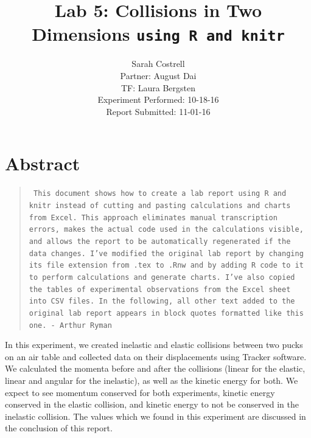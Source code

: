 \documentclass[11pt]{article}
\begin{document}

%
\author{Sarah Costrell\\Partner: August Dai\\TF: Laura Bergsten\\Experiment Performed: 10-18-16\\Report Submitted: 11-01-16}
\title{Lab 5: Collisions in Two Dimensions {\tt using R and knitr}}
\date{}
\maketitle


\section{Abstract}

\begin{quote}
{\tt
This document shows how to create a lab report using R and knitr instead of cutting and pasting calculations and charts from Excel.
This approach eliminates manual transcription errors, makes the actual code used in the calculations visible, and allows the report to be
automatically regenerated if the data changes. 
I've modified the original lab report by changing its file extension from .tex to .Rnw and by adding R code to it to
perform calculations and generate charts.
I've also copied the tables of experimental observations from the Excel sheet into CSV files. 
In the following, all other text added to the original lab report appears in block quotes formatted like this one. - Arthur Ryman}
\end{quote}


In this experiment, we created inelastic and elastic collisions between two pucks on an air table and collected data on their displacements using Tracker software. We calculated the momenta before and after the collisions (linear for the elastic, linear and angular for the inelastic), as well as the kinetic energy for both. We expect to see momentum conserved for both experiments, kinetic energy conserved in the elastic collision, and kinetic energy to not be conserved in the inelastic collision. The values which we found in this experiment are discussed in the conclusion of this report.
\end{document}
